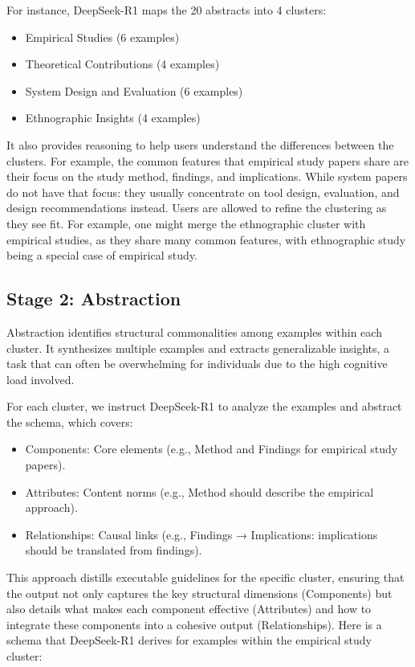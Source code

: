 For instance, DeepSeek-R1 maps the 20 abstracts into 4 clusters:
\begin{itemize}[noitemsep]
    \item Empirical Studies (6 examples)
    \item Theoretical Contributions (4 examples)
    \item System Design and Evaluation (6 examples)
    \item Ethnographic Insights (4 examples)
\end{itemize}
It also provides reasoning to help users understand the differences between the clusters.
For example, the common features that empirical study papers share are their focus on the study method, findings, and implications.
While system papers do not have that focus: they usually concentrate on tool design, evaluation, and design recommendations instead.
Users are allowed to refine the clustering as they see fit.
For example, one might merge the ethnographic cluster with empirical studies, as they share many common features, with ethnographic study being a special case of empirical study.


\subsection{Stage 2: Abstraction}
Abstraction identifies structural commonalities among examples within each cluster.  
It synthesizes multiple examples and extracts generalizable insights, a task that can often be overwhelming for individuals due to the high cognitive load involved.

For each cluster, we instruct DeepSeek-R1 to analyze the examples and abstract the schema, which covers:
\begin{itemize}[noitemsep]
\item Components: Core elements (e.g., Method and Findings for empirical study papers).
\item Attributes: Content norms (e.g., Method should describe the empirical approach).
\item Relationships: Causal links (e.g., Findings → Implications: implications should be translated from findings).
\end{itemize}
This approach distills executable guidelines for the specific cluster, ensuring that the output not only captures the key structural dimensions (Components) but also details what makes each component effective (Attributes) and how to integrate these components into a cohesive output (Relationships).
Here is a schema that DeepSeek-R1 derives for examples within the empirical study cluster:

